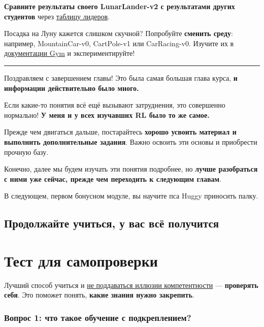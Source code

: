 \documentclass[11pt,a4paper]{article}
\begin{document}
\textbf{Сравните результаты своего LunarLander-v2 с результатами других студентов} через \href{https://huggingface.co/spaces/huggingface-projects/Deep-Reinforcement-Learning-Leaderboard}{таблицу лидеров}.

Посадка на Луну кажется слишком скучной? Попробуйте \textbf{сменить среду}: например, MountainCar-v0, CartPole-v1 или CarRacing-v0. Изучите их в \href{https://www.gymlibrary.dev/}{документации Gym} и экспериментируйте!

\begin{center}\rule{0.5\linewidth}{0.5pt}\end{center}

Поздравляем с завершением главы! Это была самая большая глава курса, \textbf{и информации действительно было много.}

Если какие-то понятия всё ещё вызывают затруднения, это совершенно нормально! \textbf{У меня и у всех изучавших RL было то же самое.}

Прежде чем двигаться дальше, постарайтесь \textbf{хорошо усвоить материал и выполнить дополнительные задания}. Важно освоить эти основы и приобрести прочную базу.

Конечно, далее мы будем изучать эти понятия подробнее, но \textbf{лучше разобраться с ними уже сейчас, прежде чем переходить к следующим главам}.

В следующем, первом бонусном модуле, вы научите пса Huggy приносить палку.


\subsection{Продолжайте учиться, у вас всё получится}\label{keep-learning-stay-awesome}

\section{Тест для самопроверки}\label{quiz}

Лучший способ учиться и \href{https://www.coursera.org/lecture/learning-how-to-learn/illusions-of-competence-BuFzf}{не поддаваться иллюзии компетентности} --- \textbf{проверять себя}. Это поможет понять, \textbf{какие знания нужно закрепить}.

\subsubsection{Вопрос 1: что такое обучение с подкреплением?}\label{q1-what-is-reinforcement-learning}
\end{document}
